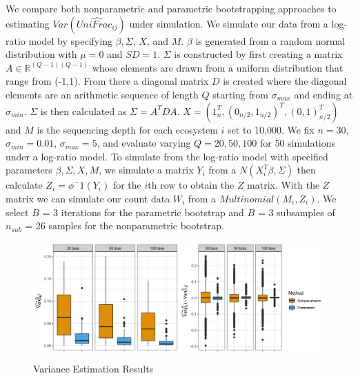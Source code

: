 \documentclass{article}
\begin{document}
We compare both nonparametric and parametric bootstrapping approaches to estimating $Var(\widehat{UniFrac_{ij}})$ under simulation. We simulate our data from a log-ratio model by specifying $\beta, \Sigma$, $X$, and $M$. $\beta$ is generated from a random normal distribution with $\mu = 0$ and $SD = 1$. $\Sigma$ is constructed by first creating a matrix $A \in \mathbb{R}^{(Q-1)(Q-1)}$ whose elements are drawn from a uniform distribution that range from (-1,1). From there a diagonal matrix $D$ is created where the diagonal elements are an arithmetic sequence of length $Q$ starting from $\sigma_{max}$ and ending at $\sigma_{min}$. $\Sigma$ is then calculated as $\Sigma = A^{T}DA$.  $X =(1_n^{T}, (0_{n/2},1_{n/2})^{T},(0,1)_{n/2}^{T})$ and $M$ is the sequencing depth for each ecosystem $i$ set to 10,000. We fix $n = 30$, $\sigma_{min}=0.01$, $\sigma_{max}= 5$, and evaluate varying $Q = 20, 50, 100$ for 50 simulations under a log-ratio model. To simulate from the log-ratio model with specified parameters $\beta, \Sigma, X, M$, we simulate a matrix $Y_i$ from a  $N(X_{i}^{T}\beta,\Sigma)$ then calculate $Z_i = \phi^-1(Y_i)$ for the $i$th row to obtain the $Z$ matrix. With the $Z$ matrix we can simulate our count data $W_i$ from a $Multinomial(M_i,Z_i)$. We select $B$ = 3 iterations for the parametric bootstrap and $B$ = 3 subsamples of $n_{sub}$ = 26 samples for the nonparametric bootstrap.

\begin{figure}[!htb]
  \captionsetup{singlelinecheck = false, format= hang, justification = raggedright, font = sf, labelsep = space}
   \caption{Variance Estimation Results}
  \centering
    \includegraphics[width=\textwidth]{variance_plots2.png}
\end{figure}
\end{document}
